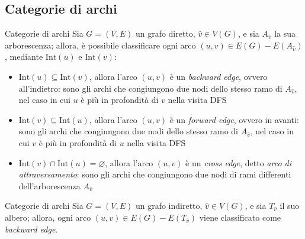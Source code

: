\documentclass[a4paper, 12pt]{report}
\begin{document}
    \subsection{Categorie di archi}

    \begin{framedobs}{Categorie di archi}
        Sia $G= (V, E)$ un grafo diretto, $\hat v \in V(G)$, e sia $A_{\hat v}$ la sua arborescenza; allora, è possibile classificare ogni arco $(u, v) \in E(G) - E(A_{\hat v})$, mediante $\mathrm{Int}(u)$ e $\mathrm{Int}(v)$:
        \begin{itemize}
            \item $\mathrm{Int}(u) \subseteq \mathrm{Int}(v)$, allora l'arco $(u, v)$ è un \textit{backward edge}, ovvero all'indietro: sono gli archi che congiungono due nodi dello stesso ramo di $A_{\hat v}$, nel caso in cui $u$ è più in profondità di $v$ nella visita DFS 
            \item $\mathrm{Int}(v) \subseteq \mathrm{Int}(u)$, allora l'arco $(u, v)$ è un \textit{forward edge}, ovvero in avanti: sono gli archi che congiungono due nodi dello stesso ramo di $A_{\hat v}$, nel caso in cui $v$ è più in profondità di $u$ nella visita DFS
            \item $\mathrm{Int}(v) \cap \mathrm{Int}(u) = \varnothing$, allora l'arco $(u, v)$ è un \textit{cross edge}, detto \textit{arco di attraversamento}: sono gli archi che congiungono due nodi di rami differenti dell'arborescenza $A_{\hat v}$
        \end{itemize}
    \end{framedobs}

    \begin{framedobs}{Categorie di archi}
        Sia $G=(V, E)$ un grafo indiretto, $\hat v \in V(G)$, e sia $T_{\hat v}$ il suo albero; allora, ogni arco $(u, v) \in E(G) - E(T_{\hat v})$ viene classificato come \textit{backward edge}.
    \end{framedobs}
\end{document}

